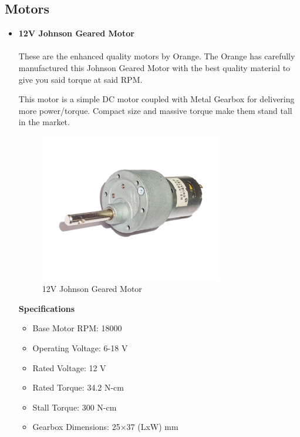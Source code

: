 \newpage

\subsection{Motors}

\begin{itemize}[wide, labelwidth=!, labelindent=0pt]
    \item \textbf{12V Johnson Geared Motor}
    \vspace{-0.5cm}
    \paragraph{}These are the enhanced quality motors by Orange. The Orange has carefully manufactured this Johnson Geared Motor with the best quality material to give you said torque at said RPM.
    
    This motor is a simple DC motor coupled with Metal Gearbox for delivering more power/torque. Compact size and massive torque make them stand tall in the market. 

    \begin{figure}[H]
    \centering
    \includegraphics[width = 8cm]{project/images/johnson_motor.jpg}
    \caption{12V Johnson Geared Motor}
    \end{figure}
    
    \begin{center}{\textbf{Specifications}}\end{center}
    
    \begin{itemize}
        \item Base Motor RPM: 18000
        \item Operating Voltage: 6-18 V
        \item Rated Voltage: 12 V
        \item Rated Torque: 34.2 N-cm
        \item Stall Torque: 300 N-cm
        \item Gearbox Dimensions: 25×37 (LxW) mm
    \end{itemize}
    

\end{itemize}

